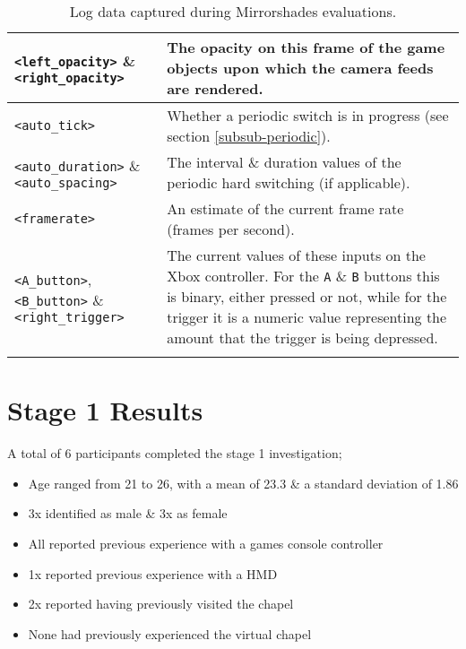 \begin{center}
\begin{longtable}{ l  p{8cm} }
\midrule

\texttt{<left\_opacity>} \& \texttt{<right\_opacity>} & The opacity on this frame of the game objects upon which the camera feeds are rendered. \\

\midrule

\texttt{<auto\_tick>} & Whether a periodic switch is in progress (see section \ref{subsub-periodic}). \\

\midrule

\texttt{<auto\_duration>} \& \texttt{<auto\_spacing>} & The interval \& duration values of the periodic hard switching (if applicable). \\

\midrule

\texttt{<framerate>} & An estimate of the current frame rate (frames per second). \\

\midrule

\texttt{<A\_button>}, \texttt{<B\_button>} \& \texttt{<right\_trigger>} & The current values of these inputs on the Xbox controller. For the \texttt{A} \& \texttt{B} buttons this is binary, either pressed or not, while for the trigger it is a numeric value representing the amount that the trigger is being depressed. \\

\bottomrule
\caption{Log data captured during Mirrorshades evaluations.}
\label{logdatatable}
\end{longtable}
\end{center}


\section{Stage 1 Results}

A total of 6 participants completed the stage 1 investigation;
\begin{itemize}
	\item Age ranged from 21 to 26, with a mean of 23.3 \& a standard deviation of 1.86
	\item 3x identified as male \& 3x as female
	\item All reported previous experience with a games console controller
	\item 1x reported previous experience with a HMD
	\item 2x reported having previously visited the chapel
	\item None had previously experienced the virtual chapel
\end{itemize}

